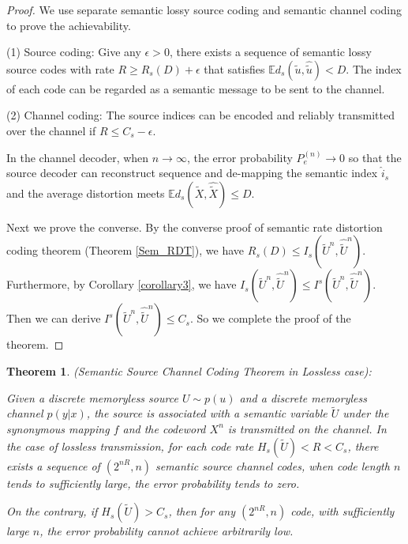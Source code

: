 \documentclass[12pt, draftclsnofoot,onecolumn]{IEEEtran}
\newtheorem{theorem}{\bf{Theorem}}
\begin{document}
\begin{proof}
We use separate semantic lossy source coding and semantic channel coding to prove the achievability.

(1) Source coding: Give any $\epsilon>0$, there exists a sequence of semantic lossy source codes with rate $R\geq R_s(D)+\epsilon$ that satisfies $\mathbb{E}d_s(\tilde{u},\hat{\tilde{u}})<D$. The index of each code can be regarded as a semantic message to be sent to the channel.

(2) Channel coding: The source indices can be encoded and reliably transmitted over the channel if $R\leq C_s-\epsilon$.

In the channel decoder, when $n\to \infty$, the error probability $P_e^{(n)}\to 0$ so that the source decoder can reconstruct sequence and de-mapping the semantic index $\hat{i}_s$ and the average distortion meets $\mathbb{E}d_s(\tilde{X},\hat{\tilde{X}})\leq D$.

Next we prove the converse.
By the converse proof of semantic rate distortion coding theorem (Theorem \ref{Sem_RDT}), we have $R_s(D)\leq I_s(\tilde{U}^n,\hat{\tilde{U}}^n)$. Furthermore, by Corollary \ref{corollary3}, we have $I_s(\tilde{U}^n,\hat{\tilde{U}}^n)\leq I^s(\tilde{U}^n,\hat{\tilde{U}}^n)$. Then we can derive $I^s(\tilde{U}^n,\hat{\tilde{U}}^n)\leq C_s$. So we complete the proof of the theorem.
\end{proof}

\begin{theorem}
(Semantic Source Channel Coding Theorem in Lossless case):

Given a discrete memoryless source $U\sim p(u)$ and a discrete memoryless channel $p(y|x)$, the source is associated with a semantic variable $\tilde{U}$ under the synonymous mapping $f$ and the codeword $X^n$ is transmitted on the channel. In the case of lossless transmission, for each code rate $H_s(\tilde{U})<R<C_s$, there exists a sequence of $\left(2^{nR},n\right)$ semantic source channel codes, when code length $n$ tends to sufficiently large, the error probability tends to zero.

On the contrary, if $H_s(\tilde{U})>C_s$, then for any $\left(2^{nR},n\right)$ code, with sufficiently large $n$, the error probability cannot achieve arbitrarily low.
\end{theorem}
\end{document}
